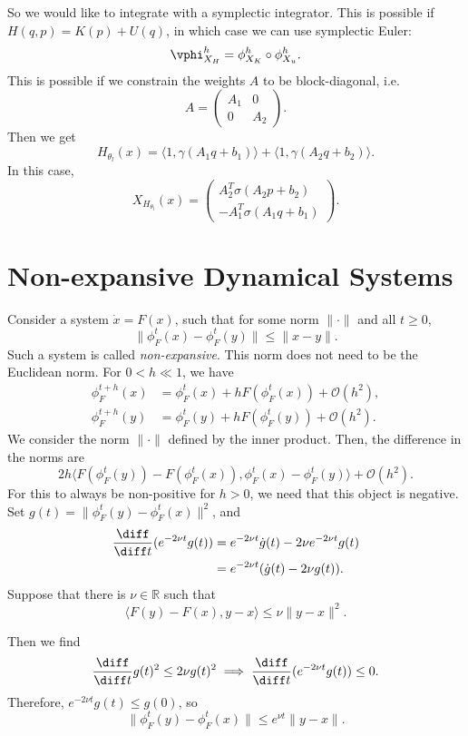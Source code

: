 \documentclass[12pt]{article}
\begin{document}
So we would like to integrate with a symplectic integrator. This is possible if $H(q, p) = K(p) + U(q)$, in which case we can use symplectic Euler:
\[
\vphi_{X_H}^{h} = \phi_{X_K}^{h} \circ \phi_{X_u}^{h}.
\]
This is possible if we constrain the weights $A$ to be block-diagonal, i.e.
\[
A =
\begin{pmatrix}
	A_1 & 0 \\ 0 & A_2
\end{pmatrix}.
\]
Then we get
\[
H_{\theta_l}(x) = \langle 1, \gamma(A_1 q + b_1) \rangle + \langle 1, \gamma(A_2 q + b_2) \rangle.
\]
In this case,
\[
X_{H_{\theta_l}}(x) =
\begin{pmatrix}
	A_2^{T} \sigma(A_2 p + b_2) \\ -A_1^{T} \sigma(A_1 q + b_1)
\end{pmatrix}.
\]

\newpage

\section{Non-expansive Dynamical Systems}%
\label{sec:neds}

Consider a system $\dot x = F(x)$, such that for some norm $\|\cdot\|$ and all $t \geq 0$,
\[
\|\phi_F^{t}(x) - \phi_F^{t}(y)\| \leq \|x - y\|.
\]
Such a system is called \emph{non-expansive}. This norm does not need to be the Euclidean norm. For $0 < h \ll 1$, we have
\begin{align*}
	\phi_F^{t + h}(x) &= \phi_F^{t}(x) + h F (\phi_F^{t}(x)) + \mathcal{O}(h^2), \\
	\phi_F^{t + h}(y) &= \phi_F^{t}(y) + h F(\phi_F^{t}(y)) + \mathcal{O}(h^2).
\end{align*}
We consider the norm $\|\cdot\|$ defined by the inner product. Then, the difference in the norms are
\[
2h \langle F(\phi_F^{t}(y)) - F(\phi_F^{t}(x)), \phi_F^{t}(x) - \phi_F^{t}(y) \rangle + \mathcal{O}(h^2).
\]
For this to always be non-positive for $h > 0$, we need that this object is negative. Set $g(t) = \|\phi_F^{t}(y) - \phi_F^{t}(x)\|^2$, and
\begin{align*}
	\frac{\diff}{\diff t} (e^{-2\nu t}g(t)) &= e^{-2 \nu t}\dot g(t) - 2 \nu e^{-2 \nu t}g(t) \\
						&= e^{-2 \nu t}(\dot g(t) - 2 \nu g(t)).
\end{align*}
Suppose that there is $\nu \in \mathbb{R}$ such that
\[
\langle F(y) - F(x), y - x \rangle \leq \nu \|y - x\|^2.
\]

Then we find
\[
\frac{\diff}{\diff t} g(t)^2 \leq 2 \nu g(t)^2 \implies \frac{\diff}{\diff t} (e^{-2 \nu t} g(t)) \leq 0.
\]
Therefore, $e^{-2 \nu t} g(t) \leq g(0)$, so
\[
\|\phi_F^{t}(y) - \phi_F^{t}(x)\| \leq e^{\nu t} \|y - x\|.
\]
\end{document}
